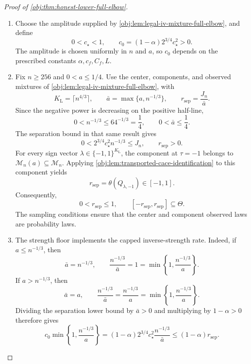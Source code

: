 \documentclass[11pt]{article}
\begin{document}
\begin{proof}[Proof of \cref{obj:thm:honest-lower-full-elbow}]
\begin{enumerate}
\item Choose the amplitude supplied by \cref{obj:lem:legal-iv-mixture-full-elbow}, and define
\[
0<c_{\star}<1,
\qquad
c_0=(1-\alpha)2^{3/4}c_{\star}^2>0.
\]
The amplitude is chosen uniformly in \(n\) and \(a\), so \(c_0\) depends on the prescribed constants \(\alpha,c_f,C_f,L\).

\item Fix \(n\ge256\) and \(0<a\le1/4\). Use the center, components, and observed mixtures of \cref{obj:lem:legal-iv-mixture-full-elbow}, with
\[
K_{\mathrm L}=\lceil n^{4/3}\rceil,
\qquad
\bar a=\max\{a,n^{-1/3}\},
\qquad
r_{\mathrm{sep}}=\frac{J_n}{\bar a}.
\]
Since the negative power is decreasing on the positive half-line,
\[
0<n^{-1/3}\le64^{-1/3}=\frac14,
\qquad
0<\bar a\le\frac14.
\]
The separation bound in that same result gives
\[
0<2^{3/4}c_{\star}^2n^{-1/3}\le J_n,
\qquad
r_{\mathrm{sep}}>0.
\]
For every sign vector \(\lambda\in\{-1,1\}^{K_{\mathrm L}}\), the component at \(\tau=-1\) belongs to \(\mathcal M_n(a)\subseteq\mathcal M_n\). Applying \cref{obj:lem:transported-cace-identification} to this component yields
\[
r_{\mathrm{sep}}
=\theta(Q_{\lambda,-1})
\in[-1,1].
\]
Consequently,
\[
0<r_{\mathrm{sep}}\le1,
\qquad
[-r_{\mathrm{sep}},r_{\mathrm{sep}}]\subseteq\Theta.
\]
The sampling conditions ensure that the center and component observed laws are probability laws.

\item The strength floor implements the capped inverse-strength rate. Indeed, if \(a\le n^{-1/3}\), then
\[
\bar a=n^{-1/3},
\qquad
\frac{n^{-1/3}}{\bar a}=1
=\min\left\{1,\frac{n^{-1/3}}a\right\}.
\]
If \(a>n^{-1/3}\), then
\[
\bar a=a,
\qquad
\frac{n^{-1/3}}{\bar a}
=\frac{n^{-1/3}}a
=\min\left\{1,\frac{n^{-1/3}}a\right\}.
\]
Dividing the separation lower bound by \(\bar a>0\) and multiplying by \(1-\alpha>0\) therefore gives
\[
c_0\min\left\{1,\frac{n^{-1/3}}a\right\}
=(1-\alpha)2^{3/4}c_{\star}^2
  \frac{n^{-1/3}}{\bar a}
\le(1-\alpha)r_{\mathrm{sep}}.
\]


\end{enumerate}
\end{proof}
\end{document}
